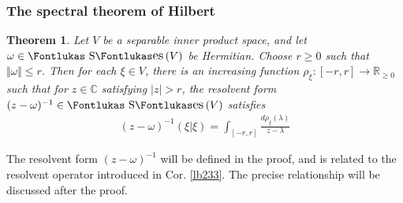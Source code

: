 \documentclass[12pt,b5paper,notitlepage]{article}
\theoremstyle{definition}
\theoremstyle{plain}
\newtheorem{thm}[df]{Theorem}
\DeclareMathOperator{\Ses}{\text{\Fontlukas S}\text{\kern -0pt {\Fontlukas\large es}}\,}
\newcommand{\Cbb}{\mathbb C}
\newcommand{\Rbb}{\mathbb R}
\numberwithin{equation}{section}
\begin{document}
\subsubsection{The spectral theorem of Hilbert}

\begin{thm}\label{lb239}
Let $V$ be a separable inner product space, and let $\omega\in\Ses(V)$ be Hermitian. Choose $r\geq0$ such that $\Vert\omega\Vert\leq r$. Then for each $\xi\in V$, there is an increasing function $\rho_\xi:[-r,r]\rightarrow\Rbb_{\geq0}$ such that for $z\in\Cbb$ satisfying $|z|>r$, the resolvent form $(z-\omega)^{-1}\in\Ses(V)$ satisfies
\begin{align}\label{eq132}
(z-\omega)^{-1}(\xi|\xi)=\int_{[-r,r]}\frac{d\rho_\xi(\lambda)}{z-\lambda}
\end{align}
\end{thm}


The resolvent form $(z-\omega)^{-1}$ will be defined in the proof, and is related to the resolvent operator introduced in Cor. \ref{lb233}. The precise relationship will be discussed after the proof.
\end{document}
